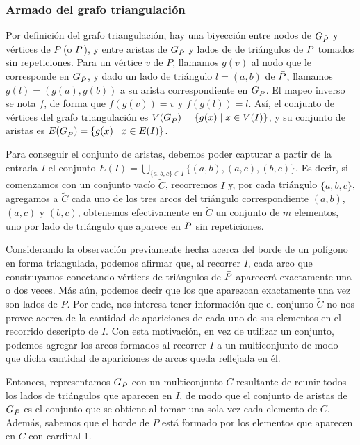\subsubsection{Armado del grafo triangulación}

Por definición del grafo triangulación, hay una biyección entre nodos de $G_{\bar{P}}$ y vértices de $P$ (o $\bar{P}$), y entre aristas de $G_{\bar{P}}$ y lados de de triángulos de $\bar{P}$ tomados sin repeticiones. Para un vértice $v$ de $P$, llamamos $g(v)$ al nodo que le corresponde en $G_{\bar{P}}$, y dado un lado de triángulo $l = (a,b)$ de $\bar{P}$, llamamos $g(l) = (g(a),g(b))$ a su arista correspondiente en $G_{\bar{P}}$. El mapeo inverso se nota $f$, de forma que $f(g(v)) = v$ y $f(g(l)) = l$. Así, el conjunto de vértices del grafo triangulación es $V(G_{\bar{P}}) = \{ g(x) \mid x \in V(I) \}$, y su conjunto de aristas es $E(G_{\bar{P}}) = \{ g(x) \mid x \in E(I) \}$.

Para conseguir el conjunto de aristas, debemos poder capturar a partir de la entrada $I$ el conjunto $E(I) = \bigcup_{\{ a,b,c \} \in I} \{ (a,b), (a,c), (b,c) \}$. Es decir, si comenzamos con un conjunto vacío $\widetilde{C}$, recorremos $I$ y, por cada triángulo $\{ a,b,c \}$, agregamos a $\widetilde{C}$ cada uno de los tres arcos del triángulo correspondiente $(a,b)$, $(a,c)$ y $(b,c)$, obtenemos efectivamente en $\widetilde{C}$ un conjunto de $m$ elementos, uno por lado de triángulo que aparece en $\bar{P}$ sin repeticiones. 

Considerando la observación previamente hecha acerca del borde de un polígono en forma triangulada, podemos afirmar que, al recorrer $I$, cada arco que construyamos conectando vértices de triángulos de $\bar{P}$ aparecerá exactamente una o dos veces. Más aún, podemos decir que los que aparezcan exactamente una vez son lados de $P$. Por ende, nos interesa tener información que el conjunto $\widetilde{C}$ no nos provee acerca de la cantidad de apariciones de cada uno de sus elementos en el recorrido descripto de $I$. Con esta motivación, en vez de utilizar un conjunto, podemos agregar los arcos formados al recorrer $I$ a un multiconjunto de modo que dicha cantidad de apariciones de arcos queda reflejada en él.

Entonces, representamos $G_{\bar{P}}$ con un multiconjunto $C$ resultante de reunir todos los lados de triángulos que aparecen en $I$, de modo que el conjunto de aristas de $G_{\bar{P}}$ es el conjunto que se obtiene al tomar una sola vez cada elemento de $C$. Además, sabemos que el borde de $P$ está formado por los elementos que aparecen en $C$ con cardinal 1.

